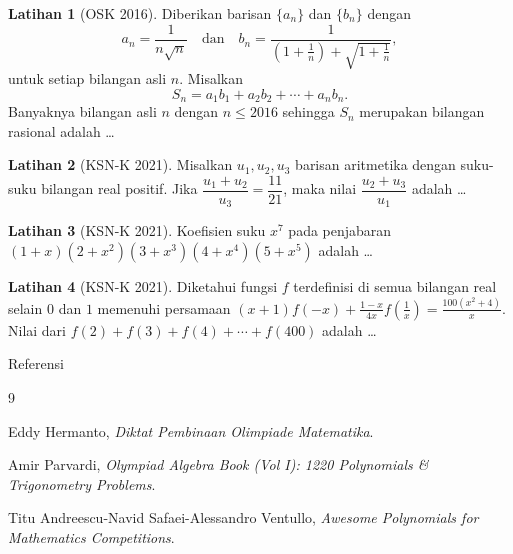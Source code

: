 \documentclass[aspectratio=169]{beamer}
\theoremstyle{definition}
\newtheorem{latihan}{Latihan}
\begin{document}
\begin{frame}{\insertsection}
  \begin{latihan}[OSK 2016]
    Diberikan barisan $\{a_n\}$ dan $\{b_n\}$ dengan
    \[
      a_n = \frac{1}{n\sqrt{n}}
      \quad \text{dan} \quad
      b_n = \frac{1}{\left(1+\frac{1}{n}\right) + \sqrt{1+\frac{1}{n}}},
    \]
    untuk setiap bilangan asli $n$. Misalkan
    \[
      S_n = a_1b_1 + a_2b_2 + \cdots + a_n b_n.
    \]
    Banyaknya bilangan asli $n$ dengan $n \le 2016$ sehingga $S_n$ merupakan bilangan rasional adalah \ldots
  \end{latihan}
\end{frame}

\begin{frame}{\insertsection}
  \begin{latihan}[KSN-K 2021]
    Misalkan $u_1, u_2, u_3$ barisan aritmetika dengan suku-suku bilangan real positif.
    Jika $\dfrac{u_1 + u_2}{u_3} = \dfrac{11}{21}$, maka nilai $\dfrac{u_2 + u_3}{u_1}$ adalah \ldots
  \end{latihan}
  \begin{latihan}[KSN-K 2021]
    Koefisien suku $x^7$ pada penjabaran $(1 + x)(2 + x^2)(3 + x^3)(4 + x^4)(5 + x^5)$ adalah \ldots
  \end{latihan}
  \begin{latihan}[KSN-K 2021]
    Diketahui fungsi $f$ terdefinisi di semua bilangan real selain $0$ dan $1$ memenuhi persamaan
    $
      (x+1)f(-x) + \frac{1-x}{4x} f\left(\frac{1}{x}\right) = \frac{100(x^2+4)}{x}.
    $
    Nilai dari $f(2) + f(3) + f(4) + \cdots + f(400)$ adalah \ldots
  \end{latihan}
\end{frame}

\begin{frame}{Referensi}
  \begin{thebibliography}{9}

    Eddy Hermanto,
    \emph{Diktat Pembinaan Olimpiade Matematika}.

    Amir Parvardi,
    \emph{Olympiad Algebra Book (Vol I): 1220 Polynomials \& Trigonometry Problems}.

    Titu Andreescu-Navid Safaei-Alessandro Ventullo,
    \emph{Awesome Polynomials for Mathematics Competitions}.

  \end{thebibliography}
\end{frame}
\end{document}

